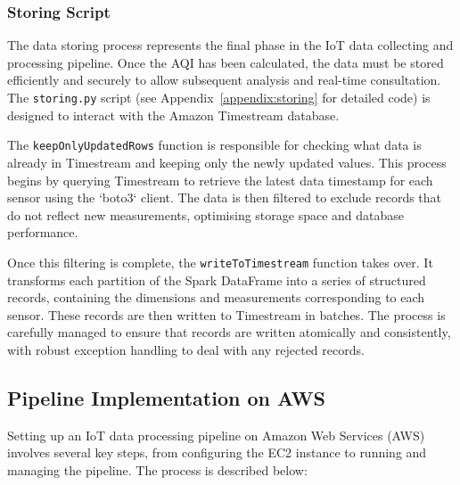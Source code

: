 \documentclass[12pt,oneside]{book} %
\begin{document}
\subsubsection{Storing Script}
The data storing process represents the final phase in the IoT data collecting
and processing pipeline. Once the AQI has been calculated, the data must be
stored efficiently and securely to allow subsequent analysis and real-time
consultation. The \texttt{storing.py} script (see
Appendix~\ref{appendix:storing} for detailed code) is designed to interact with
the Amazon Timestream database.

The \texttt{keepOnlyUpdatedRows} function is responsible for checking what data
is already in Timestream and keeping only the newly updated values. This
process begins by querying Timestream to retrieve the latest data timestamp for
each sensor using the `boto3` client. The data is then filtered to exclude
records that do not reflect new measurements, optimising storage space and
database performance.

Once this filtering is complete, the \texttt{writeToTimestream} function takes
over. It transforms each partition of the Spark DataFrame into a series of
structured records, containing the dimensions and measurements corresponding to
each sensor. These records are then written to Timestream in batches. The
process is carefully managed to ensure that records are written atomically and
consistently, with robust exception handling to deal with any rejected records.

\subsection{Pipeline Implementation on AWS}
Setting up an IoT data processing pipeline on Amazon Web Services (AWS)
involves several key steps, from configuring the EC2 instance to running and
managing the pipeline. The process is described below:
\end{document}
